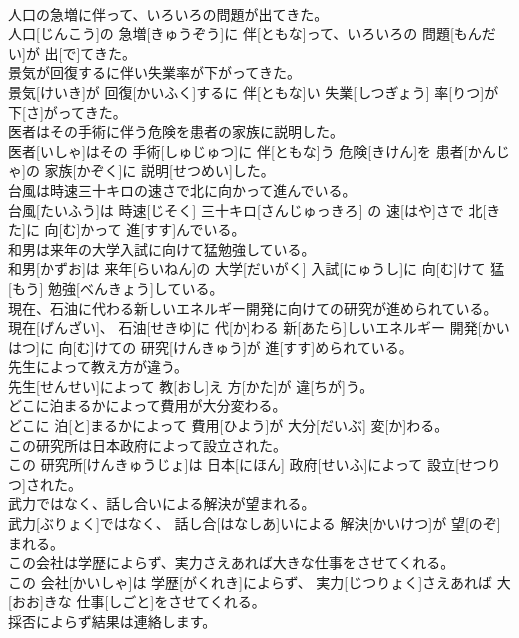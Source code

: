 \documentclass[8pt]{extreport}
\begin{document}
\begin{CJK}{UTF8}{min}
\\	人口の急増に伴って、いろいろの問題が出てきた。	
\\	人口[じんこう]の 急増[きゅうぞう]に 伴[ともな]って、いろいろの 問題[もんだい]が 出[で]てきた。
\\	景気が回復するに伴い失業率が下がってきた。	
\\	景気[けいき]が 回復[かいふく]するに 伴[ともな]い 失業[しつぎょう] 率[りつ]が 下[さ]がってきた。
\\	医者はその手術に伴う危険を患者の家族に説明した。	
\\	医者[いしゃ]はその 手術[しゅじゅつ]に 伴[ともな]う 危険[きけん]を 患者[かんじゃ]の 家族[かぞく]に 説明[せつめい]した。
\\	台風は時速三十キロの速さで北に向かって進んでいる。	
\\	台風[たいふう]は 時速[じそく] 三十キロ[さんじゅっきろ] の 速[はや]さで 北[きた]に 向[む]かって 進[すす]んでいる。
\\	和男は来年の大学入試に向けて猛勉強している。	
\\	和男[かずお]は 来年[らいねん]の 大学[だいがく] 入試[にゅうし]に 向[む]けて 猛[もう] 勉強[べんきょう]している。
\\	現在、石油に代わる新しいエネルギー開発に向けての研究が進められている。	
\\	現在[げんざい]、 石油[せきゆ]に 代[か]わる 新[あたら]しいエネルギー 開発[かいはつ]に 向[む]けての 研究[けんきゅう]が 進[すす]められている。
\\	先生によって教え方が違う。	
\\	先生[せんせい]によって 教[おし]え 方[かた]が 違[ちが]う。
\\	どこに泊まるかによって費用が大分変わる。	
\\	どこに 泊[と]まるかによって 費用[ひよう]が 大分[だいぶ] 変[か]わる。
\\	この研究所は日本政府によって設立された。	
\\	この 研究所[けんきゅうじょ]は 日本[にほん] 政府[せいふ]によって 設立[せつりつ]された。
\\	武力ではなく、話し合いによる解決が望まれる。	
\\	武力[ぶりょく]ではなく、 話し合[はなしあ]いによる 解決[かいけつ]が 望[のぞ]まれる。
\\	この会社は学歴によらず、実力さえあれば大きな仕事をさせてくれる。	
\\	この 会社[かいしゃ]は 学歴[がくれき]によらず、 実力[じつりょく]さえあれば 大[おお]きな 仕事[しごと]をさせてくれる。
\\	採否によらず結果は連絡します。	

\end{CJK}
\end{document}

